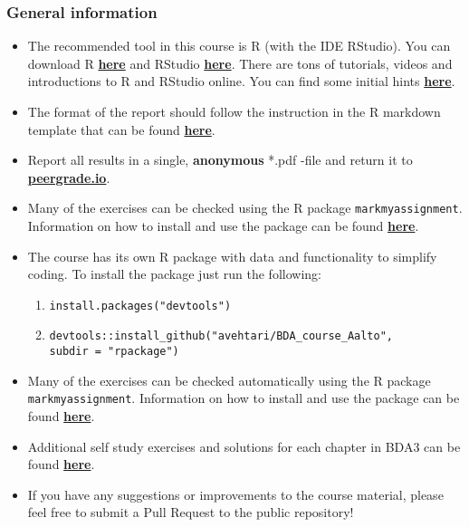 
\subsubsection*{General information}

\begin{itemize}
\itemsep0em 
\item The recommended tool in this course is R (with the IDE RStudio). You can download R \href{https://cran.r-project.org/}{\textbf{here}} and RStudio \href{https://www.rstudio.com/products/rstudio/download/}{\textbf{here}}. There are tons of tutorials, videos and introductions to R and RStudio online. You can find some initial hints \href{https://www.rstudio.com/online-learning/}{\textbf{here}}. 
\item  The format of the report should follow the instruction in the R markdown template that can be found \href{https://raw.githubusercontent.com/MansMeg/BDA_course_Aalto/master/templates/assignment_template.rmd}{\textbf{here}}. 
\item  Report all results in a single, {\bf anonymous} *.pdf -file and return it to \href{peergrade.io}{\textbf{peergrade.io}}. 
\item Many of the exercises can be checked using the R package \texttt{markmyassignment}. Information on how to install and use the package can be found \href{https://cran.r-project.org/web/packages/markmyassignment/vignettes/markmyassignment.html}{\textbf{here}}.
\item The course has its own R package with data and functionality to simplify coding. To install the package just run the following:
\begin{enumerate}
\item \texttt{install.packages("devtools")}
\item \texttt{devtools::install\_github("avehtari/BDA\_course\_Aalto", \\ subdir = "rpackage")}
\end{enumerate}
\item Many of the exercises can be checked automatically using the R package \\ \texttt{markmyassignment}. Information on how to install and use the package can be found \href{https://cran.r-project.org/web/packages/markmyassignment/vignettes/markmyassignment.html}{\textbf{here}}.
\item Additional self study exercises and solutions for each chapter in BDA3 can be found \href{http://www.stat.columbia.edu/~gelman/book/solutions3.pdf}{\textbf{here}}.
\item If you have any suggestions or improvements to the course material, please feel free to submit a Pull Request to the public repository!
\end{itemize}